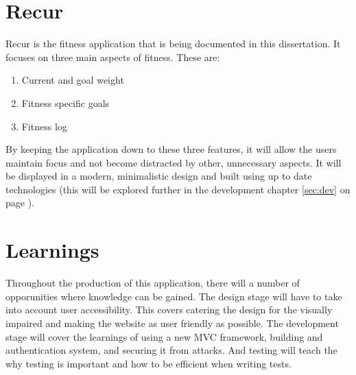 \section{Recur}
Recur is the fitness application that is being documented in this dissertation. It focuses on three main aspects of fitness. These are:

\begin{enumerate}
\item {Current and goal weight}
\item {Fitness specific goals}
\item {Fitness log}
\end{enumerate}

\noindent
By keeping the application down to these three features, it will allow the users maintain focus and not become distracted by other, unnecessary aspects. It will be displayed in a modern, minimalistic design and built using up to date technologies (this will be explored further in the development chapter \ref{sec:dev} on page \pageref{sec:dev}).\\

\section{Learnings}
Throughout the production of this application, there will a number of opporunities where knowledge can be gained. The design stage will have to take into account user accessibility. This covers catering the design for the visually impaired and making the website as user friendly as possible. The development stage will cover the learnings of using a new MVC framework, building and authentication system, and securing it from attacks. And testing will teach the why testing is important and how to be efficient when writing tests.\\

